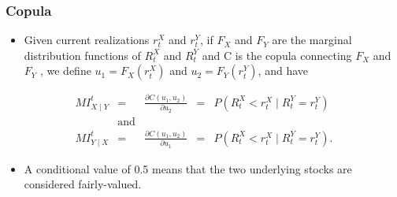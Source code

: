 \documentclass[pdf,9pt,xcolor=dvipsnames,hide notes]{beamer}
\begin{document}
\begin{frame}[label=frame4f]
	\frametitle{Copula}
	
		\vspace{0.3cm}
	
		\begin{itemize}
			\item 	Given current realizations $r_{t}^{X}$ and $r_{t}^{Y}$, if $F_{X}$ and $F_{Y} $ are the marginal distribution functions of $R_{t}^{X}$ and $R_{t}^{Y} $ and C is the copula connecting $F_{X}$ and $F_{Y}$ , we define $u_{1}=F_{X}\left( r_{t}^{X}\right) $ and $u_{2}=F_{Y}\left( r_{t}^{Y}\right) $, and have
		\end{itemize}
	
				
		\begin{equation}
		\begin{aligned}
		MI_{X\mid Y}^{t}& = &\frac{\partial C(u_{1},u_{2})}{\partial u_{2}} & = & P(R_{t}^{X}<r_{t}^{X}\mid R_{t}^{Y}=r_{t}^{Y}) \\
		& \text{and} & \\
		MI_{Y\mid X}^{t}& = &\frac{\partial C(u_{1},u_{2})}{\partial u_{1}}& = & P(R_{t}^{X}<r_{t}^{X}\mid R_{t}^{Y}=r_{t}^{Y}).
		\end{aligned}
		\label{eq:eq31}
		\end{equation}
		
		\vspace{0.3cm}
		
			\begin{itemize}
			\justifying
			\item A conditional value of 0.5 means that
			the two underlying stocks are considered fairly-valued.
			\end{itemize}
\end{frame}
\end{document}
